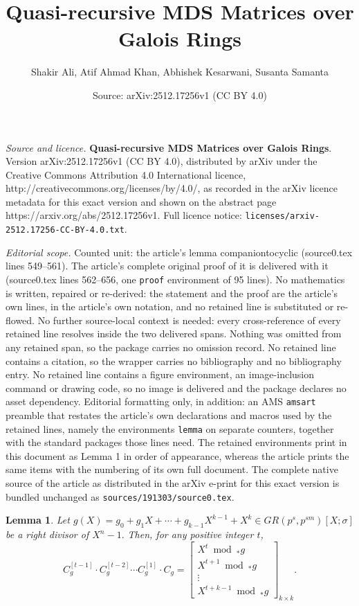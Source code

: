 \documentclass[10pt,a4paper]{amsart}
\title{\textbf{Quasi-recursive MDS Matrices over Galois Rings}}
\author{Shakir Ali, Atif Ahmad Khan, Abhishek Kesarwani, Susanta Samanta}
\date{Source: arXiv:2512.17256v1 (CC BY 4.0)}
\newtheorem{lemma}{Lemma}
\begin{document}
\maketitle

\noindent\emph{Source and licence.} \textbf{Quasi-recursive MDS Matrices over Galois Rings}. Version arXiv:2512.17256v1 (CC BY 4.0), distributed by arXiv under the Creative Commons Attribution 4.0 International licence, http://creativecommons.org/licenses/by/4.0/, as recorded in the arXiv licence metadata for this exact version and shown on the abstract page https://arxiv.org/abs/2512.17256v1. Full licence notice: \texttt{licenses/arxiv-2512.17256-CC-BY-4.0.txt}.\par\smallskip

\noindent\textit{Editorial scope.} Counted unit: the article's lemma companiontocyclic (source0.tex lines 549--561). The article's complete original proof of it is delivered with it (source0.tex lines 562--656, one \texttt{proof} environment of 95 lines). No mathematics is written, repaired or re-derived: the statement and the proof are the article's own lines, in the article's own notation, and no retained line is substituted or re-flowed.  No further source-local context is needed: every cross-reference of every retained line resolves inside the two delivered spans.  Nothing was omitted from any retained span, so the package carries no omission record.  No retained line contains a citation, so the wrapper carries no bibliography and no bibliography entry.  No retained line contains a figure environment, an image-inclusion command or drawing code, so no image is delivered and the package declares no asset dependency.  Editorial formatting only, in addition: an AMS \texttt{amsart} preamble that restates the article's own declarations and macros used by the retained lines, namely the environments \texttt{lemma} on separate counters, together with the standard packages those lines need.  The retained environments print in this document as Lemma 1 in order of appearance, whereas the article prints the same items with the numbering of its own full document.  The complete native source of the article as distributed in the arXiv e-print for this exact version is bundled unchanged as \texttt{sources/191303/source0.tex}.
\begin{lemma}\label{companiontocyclic}
    Let $g(X)=g_0+g_1X+\cdots+g_{k-1}X^{k-1}+X^k\in GR(p^s,p^{sm})[X;\sigma]$ be a right divisor of $X^n-1.$ 
    Then, for any positive integer $t$,
    \[
    C^{[t-1]}_g \cdot C^{[t-2]}_g \cdots C^{[1]}_g \cdot C_g =
    \begin{bmatrix}
        X^t \bmod_\ast g\\
        X^{t+1} \bmod_\ast g\\
        \vdots\\
        X^{t+k-1} \bmod_\ast g
    \end{bmatrix}_{k\times k}.
    \]
\end{lemma}
\end{document}
